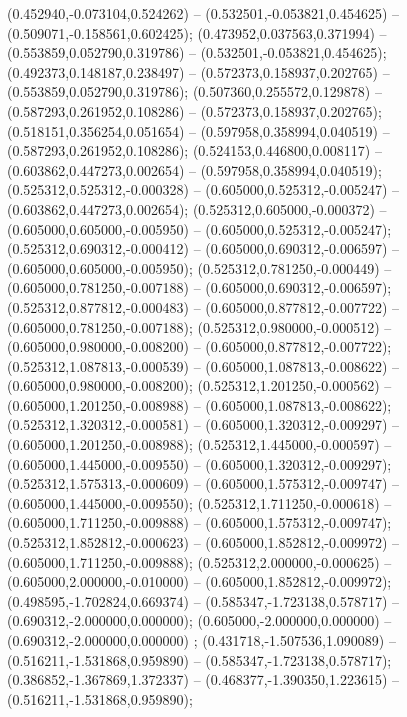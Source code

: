  (0.452940,-0.073104,0.524262) -- (0.532501,-0.053821,0.454625) -- (0.509071,-0.158561,0.602425);
 (0.473952,0.037563,0.371994) -- (0.553859,0.052790,0.319786) -- (0.532501,-0.053821,0.454625);
 (0.492373,0.148187,0.238497) -- (0.572373,0.158937,0.202765) -- (0.553859,0.052790,0.319786);
 (0.507360,0.255572,0.129878) -- (0.587293,0.261952,0.108286) -- (0.572373,0.158937,0.202765);
 (0.518151,0.356254,0.051654) -- (0.597958,0.358994,0.040519) -- (0.587293,0.261952,0.108286);
 (0.524153,0.446800,0.008117) -- (0.603862,0.447273,0.002654) -- (0.597958,0.358994,0.040519);
 (0.525312,0.525312,-0.000328) -- (0.605000,0.525312,-0.005247) -- (0.603862,0.447273,0.002654);
 (0.525312,0.605000,-0.000372) -- (0.605000,0.605000,-0.005950) -- (0.605000,0.525312,-0.005247);
 (0.525312,0.690312,-0.000412) -- (0.605000,0.690312,-0.006597) -- (0.605000,0.605000,-0.005950);
 (0.525312,0.781250,-0.000449) -- (0.605000,0.781250,-0.007188) -- (0.605000,0.690312,-0.006597);
 (0.525312,0.877812,-0.000483) -- (0.605000,0.877812,-0.007722) -- (0.605000,0.781250,-0.007188);
 (0.525312,0.980000,-0.000512) -- (0.605000,0.980000,-0.008200) -- (0.605000,0.877812,-0.007722);
 (0.525312,1.087813,-0.000539) -- (0.605000,1.087813,-0.008622) -- (0.605000,0.980000,-0.008200);
 (0.525312,1.201250,-0.000562) -- (0.605000,1.201250,-0.008988) -- (0.605000,1.087813,-0.008622);
 (0.525312,1.320312,-0.000581) -- (0.605000,1.320312,-0.009297) -- (0.605000,1.201250,-0.008988);
 (0.525312,1.445000,-0.000597) -- (0.605000,1.445000,-0.009550) -- (0.605000,1.320312,-0.009297);
 (0.525312,1.575313,-0.000609) -- (0.605000,1.575312,-0.009747) -- (0.605000,1.445000,-0.009550);
 (0.525312,1.711250,-0.000618) -- (0.605000,1.711250,-0.009888) -- (0.605000,1.575312,-0.009747);
 (0.525312,1.852812,-0.000623) -- (0.605000,1.852812,-0.009972) -- (0.605000,1.711250,-0.009888);
 (0.525312,2.000000,-0.000625) -- (0.605000,2.000000,-0.010000) -- (0.605000,1.852812,-0.009972);
 (0.498595,-1.702824,0.669374) -- (0.585347,-1.723138,0.578717) -- (0.690312,-2.000000,0.000000);
 (0.605000,-2.000000,0.000000) -- (0.690312,-2.000000,0.000000) ;
 (0.431718,-1.507536,1.090089) -- (0.516211,-1.531868,0.959890) -- (0.585347,-1.723138,0.578717);
 (0.386852,-1.367869,1.372337) -- (0.468377,-1.390350,1.223615) -- (0.516211,-1.531868,0.959890);

